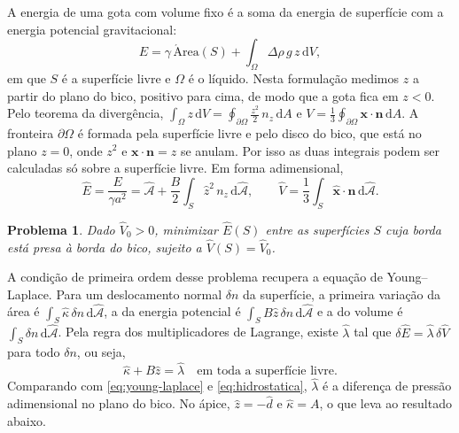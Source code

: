 \documentclass[12pt, oneside, a4paper, english, brazil]{abntex2}
\theoremstyle{relatorio}
\theoremstyle{relatorioit}
\theoremstyle{problema}
\newtheorem{problema}{Problema}[section]
\newcommand{\Vh}{\hat V}
\newcommand{\dhat}{\hat d}
\newcommand{\lh}{\hat\lambda}
\newcommand{\Eh}{\hat E}
\begin{document}
A energia de uma gota com volume fixo é a soma da energia de superfície com a energia
potencial gravitacional:
\begin{equation}
  E = \gamma\, \mathrm{\acute{A}rea}(S) + \int_\Omega \Delta\rho\, g\, z \,\mathrm{d}V,
  \label{eq:energia}
\end{equation}
em que $S$ é a superfície livre e $\Omega$ é o líquido. Nesta formulação medimos $z$ a
partir do plano do bico, positivo para cima, de modo que a gota fica em $z < 0$. Pelo
teorema da divergência,
$\int_\Omega z \,\mathrm{d}V = \oint_{\partial\Omega} \tfrac{z^2}{2}\, n_z \,\mathrm{d}A$ e
$V = \tfrac{1}{3}\oint_{\partial\Omega} \mathbf{x}\cdot\mathbf{n} \,\mathrm{d}A$. A
fronteira $\partial\Omega$ é formada pela superfície livre e pelo disco do bico, que
está no plano $z = 0$, onde $z^2$ e $\mathbf{x}\cdot\mathbf{n} = z$ se anulam. Por isso
as duas integrais podem ser calculadas só sobre a superfície livre. Em forma
adimensional,
\begin{equation}
  \Eh = \frac{E}{\gamma a^2} = \hat{\mathcal A} + \frac{B}{2}\int_S \hat z^2\, n_z \,\mathrm{d}\hat{\mathcal A},
  \qquad
  \Vh = \frac{1}{3}\int_S \hat{\mathbf{x}}\cdot\mathbf{n} \,\mathrm{d}\hat{\mathcal A}.
  \label{eq:energia-adim}
\end{equation}

\begin{problema}
Dado $\Vh_0 > 0$, minimizar $\Eh(S)$ entre as superfícies $S$ cuja borda está presa à
borda do bico, sujeito a $\Vh(S) = \Vh_0$.
\label{prob:continuo}
\end{problema}

A condição de primeira ordem desse problema recupera a equação de Young--Laplace. Para
um deslocamento normal $\delta n$ da superfície, a primeira variação da área é
$\int_S \hat\kappa\, \delta n \,\mathrm{d}\hat{\mathcal A}$, a da energia potencial é
$\int_S B \hat z\, \delta n \,\mathrm{d}\hat{\mathcal A}$ e a do volume é
$\int_S \delta n \,\mathrm{d}\hat{\mathcal A}$. Pela regra dos multiplicadores de
Lagrange, existe $\lh$ tal que $\delta \Eh = \lh\, \delta \Vh$ para todo $\delta n$, ou
seja,
\begin{equation}
  \hat\kappa + B \hat z = \lh \quad \text{em toda a superfície livre.}
  \label{eq:euler-lagrange}
\end{equation}
Comparando com \eqref{eq:young-laplace} e \eqref{eq:hidrostatica}, $\lh$ é a diferença
de pressão adimensional no plano do bico. No ápice, $\hat z = -\dhat$ e
$\hat\kappa = A$, o que leva ao resultado abaixo.
\end{document}
